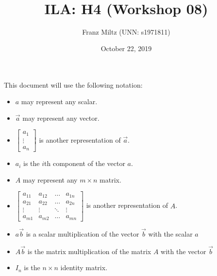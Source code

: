 \documentclass{article}
\title{ILA: H4 (Workshop 08)}
\author{Franz Miltz (UNN: s1971811)}
\date{October 22, 2019}
\begin{document}
\maketitle
This document will use the following notation:
\begin{itemize}
    \item $a$ may represent any scalar.
    \item $\vec{a}$ may represent any vector.
    \item $\begin{bmatrix}
        a_1\\
        \vdots\\
        a_n
    \end{bmatrix}$ is another representation of $\vec a$. 
    \item $a_i$ is the $i$th component of the vector $a$.
    \item $A$ may represent any $m\times n$ matrix.
    \item $\begin{bmatrix}
        a_{11} & a_{12}&\dots &a_{1n}\\
        a_{21} & a_{22}&\dots &a_{2n}\\
        \vdots & \vdots & \ddots & \vdots\\
        a_{m1} & a_{m2} &\dots &a_{mn}
    \end{bmatrix}$ is another representation of $A$.
    \item $a\vec{b}$ is a scalar multiplication of the vector $\vec{b}$ with the scalar $a$
    \item $A\vec b$ is the matrix multiplication of the matrix $A$ with the vector $\vec b$
    \item $I_n$ is the $n\times n$ identity matrix.
\end{itemize}
\end{document}
